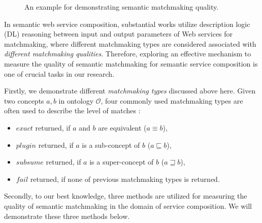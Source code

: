\begin{figure}
\centerline{
}
\caption{An example for demonstrating semantic matchmaking quality.}
\label{fig:sm_example}
\end{figure}

In semantic web service composition, substantial works \cite{bansal2016generalized,lecue2009optimizing, lecue2007making, lecue2006formal, rao2005semantic} utilize description logic (DL) reasoning between input and output parameters of Web services for matchmaking, where different matchmaking types are considered associated with \emph{different matchmaking qualities}. Therefore, exploring an effective mechanism to measure the quality of semantic matchmaking for semantic service composition is one of crucial tasks in our research. 

Firstly, we demonstrate different \emph{matchmaking types} discussed above here. Given two concepts $a, b$ in ontology $\mathcal{O}$, four commonly used matchmaking types are often used to describe the level of matches \cite{paolucci2002semantic}: 
\begin{itemize}
\item $exact$ returned, if $a$ and $b$ are equivalent ($a \equiv b$), 
\item $plugin$ returned, if $a$ is a sub-concept of $b$ ($a \sqsubseteq b$),
\item $subsume$ returned, if $a$ is a super-concept of $b$ ($a \sqsupseteq b$), 
\item $fail$ returned, if none of previous matchmaking types is returned. 
\end{itemize}

Secondly, to our best knowledge, three methods  \cite{lecue2007making, pop2009immune,shet2012new} are utilized for measuring the quality of semantic matchmaking in the domain of service composition. We will demonstrate these three methods below.

